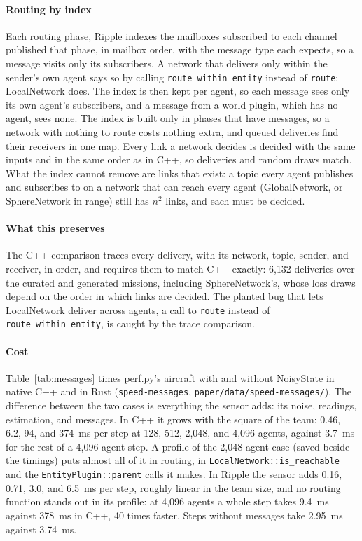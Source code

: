 \documentclass[conference]{IEEEtran}
\begin{document}
\paragraph{Routing by index}
Each routing phase, Ripple indexes the mailboxes subscribed to each channel
published that phase, in mailbox order, with the message type each expects, so
a message visits only its subscribers. A network that delivers only within the
sender's own agent says so by calling \texttt{route\_within\_entity} instead
of \texttt{route}; LocalNetwork does. The index is then kept per agent, so each
message sees only its own agent's subscribers, and a message from a world
plugin, which has no agent, sees none. The index is built only in phases that
have messages, so a network with nothing to route costs nothing extra, and
queued deliveries find their receivers in one map. Every link a network decides
is decided with the same inputs and in the same order as in C++, so deliveries
and random draws match. What the index cannot remove are links that exist: a
topic every agent publishes and subscribes to on a network that can reach every
agent (GlobalNetwork, or SphereNetwork in range) still has $n^2$ links, and
each must be decided.

\paragraph{What this preserves}
The C++ comparison traces every delivery, with its network, topic, sender, and
receiver, in order, and requires them to match C++ exactly: 6{,}132
deliveries over the curated and generated missions, including SphereNetwork's,
whose loss draws depend on the order in which links are decided. The planted
bug that lets LocalNetwork deliver across agents, a call to \texttt{route}
instead of \texttt{route\_within\_entity}, is caught by the trace comparison.

\paragraph{Cost}
Table~\ref{tab:messages} times perf.py's aircraft with and without NoisyState
in native C++ and in Rust (\texttt{speed-messages},
\texttt{paper/data/speed-messages/}). The difference between the two cases is everything the
sensor adds: its noise, readings, estimation, and messages. In C++ it grows with
the square of the team: 0.46, 6.2, 94, and 374~ms per step at 128, 512,
2{,}048, and 4{,}096 agents, against 3.7~ms for the rest of a 4{,}096-agent
step. A profile of the 2{,}048-agent case (saved beside the timings) puts
almost all of it in routing, in \texttt{LocalNetwork::is\_reachable} and the
\texttt{EntityPlugin::parent} calls it makes. In Ripple the sensor adds 0.16,
0.71, 3.0, and 6.5~ms per step, roughly linear in the team size, and no
routing function stands out in its profile: at 4{,}096 agents a whole step
takes 9.4~ms against 378~ms in C++, 40 times faster. Steps without messages
take 2.95~ms against 3.74~ms.
\end{document}
